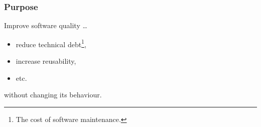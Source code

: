 \begin{frame}

\frametitle{Purpose}

\vspace{\fill}

\begin{center}

Improve software quality \ldots

\end{center}

\begin{itemize}

\item reduce technical debt\footnote{The cost of software maintenance.},

\item increase reusability,

\item etc.

\end{itemize}

\begin{center}

without changing its behaviour.

\end{center}

\vspace{\fill}

\end{frame}
